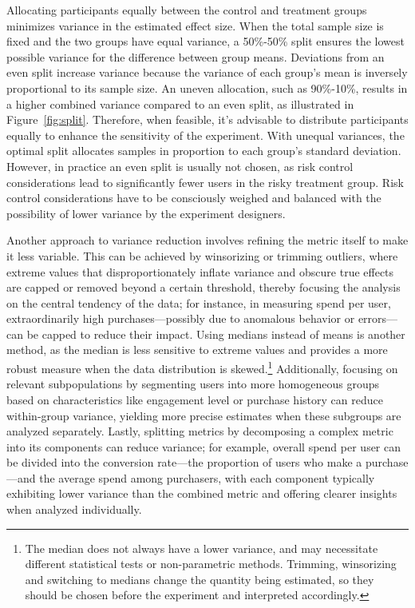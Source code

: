 \documentclass[final,5p,times,twocolumn,authoryear]{elsarticle}
\begin{document}
Allocating participants equally between the control and treatment groups minimizes variance in the estimated effect size. When the total sample size is fixed and the two groups have equal variance, a 50\%-50\% split ensures the lowest possible variance for the difference between group means. Deviations from an even split increase variance because the variance of each group's mean is inversely proportional to its sample size. An uneven allocation, such as 90\%-10\%, results in a higher combined variance compared to an even split, as illustrated in Figure~\ref*{fig:split}. Therefore, when feasible, it's advisable to distribute participants equally to enhance the sensitivity of the experiment. With unequal variances, the optimal split allocates samples in proportion to each group's standard deviation. However, in practice an even split is usually not chosen, as risk control considerations lead to significantly fewer users in the risky treatment group. Risk control considerations have to be consciously weighed and balanced with the possibility of lower variance by the experiment designers.

Another approach to variance reduction involves refining the metric itself to make it less variable. This can be achieved by winsorizing or trimming outliers, where extreme values that disproportionately inflate variance and obscure true effects are capped or removed beyond a certain threshold, thereby focusing the analysis on the central tendency of the data; for instance, in measuring spend per user, extraordinarily high purchases—possibly due to anomalous behavior or errors—can be capped to reduce their impact. Using medians instead of means is another method, as the median is less sensitive to extreme values and provides a more robust measure when the data distribution is skewed.\footnote{The median does not always have a lower variance, and may necessitate different statistical tests or non-parametric methods. Trimming, winsorizing and switching to medians change the quantity being estimated, so they should be chosen before the experiment and interpreted accordingly.} Additionally, focusing on relevant subpopulations by segmenting users into more homogeneous groups based on characteristics like engagement level or purchase history can reduce within-group variance, yielding more precise estimates when these subgroups are analyzed separately. Lastly, splitting metrics by decomposing a complex metric into its components can reduce variance; for example, overall spend per user can be divided into the conversion rate—the proportion of users who make a purchase—and the average spend among purchasers, with each component typically exhibiting lower variance than the combined metric and offering clearer insights when analyzed individually.
\end{document}
